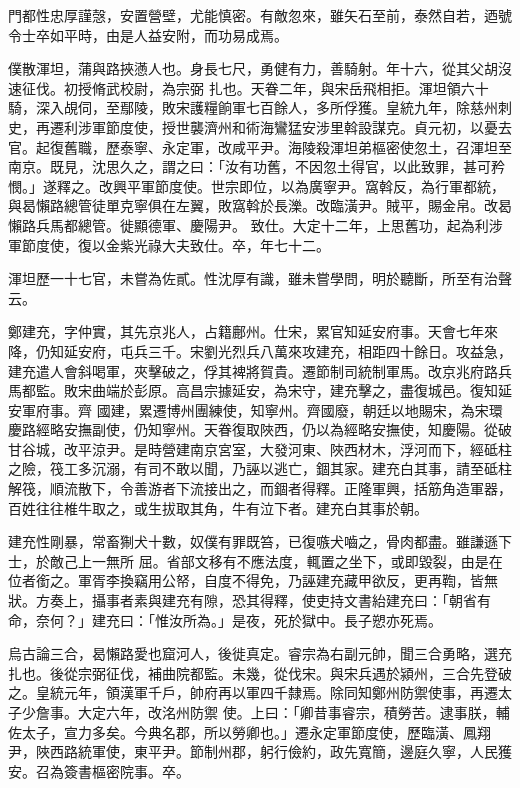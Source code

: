 \begin{pinyinscope}
 門都性忠厚謹愨，安置營壁，尤能慎密。有敵忽來，雖矢石至前，泰然自若，迺號令士卒如平時，由是人益安附，而功易成焉。



 僕散渾坦，蒲與路挾懣人也。身長七尺，勇健有力，善騎射。年十六，從其父胡沒速征伐。初授脩武校尉，為宗弼
 扎也。天眷二年，與宋岳飛相拒。渾坦領六十騎，深入覘伺，至鄢陵，敗宋護糧餉軍七百餘人，多所俘獲。皇統九年，除慈州刺史，再遷利涉軍節度使，授世襲濟州和術海鸞猛安涉里斡設謀克。貞元初，以憂去官。起復舊職，歷泰寧、永定軍，改咸平尹。海陵殺渾坦弟樞密使忽土，召渾坦至南京。既見，沈思久之，謂之曰：「汝有功舊，不因忽土得官，以此致罪，甚可矜憫。」遂釋之。改興平軍節度使。世宗即位，以為廣寧尹。窩斡反，為行軍都統，與曷懶路總管徒單克寧俱在左翼，敗窩斡於長濼。改臨潢尹。賊平，賜金帛。改曷懶路兵馬都總管。徙顯德軍、慶陽尹。
 致仕。大定十二年，上思舊功，起為利涉軍節度使，復以金紫光祿大夫致仕。卒，年七十二。



 渾坦歷一十七官，未嘗為佐貳。性沈厚有識，雖未嘗學問，明於聽斷，所至有治聲云。



 鄭建充，字仲實，其先京兆人，占籍鄜州。仕宋，累官知延安府事。天會七年來降，仍知延安府，屯兵三千。宋劉光烈兵八萬來攻建充，相距四十餘日。攻益急，建充遣人會斜喝軍，夾擊破之，俘其裨將賀貴。遷節制司統制軍馬。改京兆府路兵馬都監。敗宋曲端於彭原。高昌宗據延安，為宋守，建充擊之，盡復城邑。復知延安軍府事。齊
 國建，累遷博州團練使，知寧州。齊國廢，朝廷以地賜宋，為宋環慶路經略安撫副使，仍知寧州。天眷復取陜西，仍以為經略安撫使，知慶陽。從破甘谷城，改平涼尹。是時營建南京宮室，大發河東、陜西材木，浮河而下，經砥柱之險，筏工多沉溺，有司不敢以聞，乃誣以逃亡，錮其家。建充白其事，請至砥柱解筏，順流散下，令善游者下流接出之，而錮者得釋。正隆軍興，括筋角造軍器，百姓往往椎牛取之，或生拔取其角，牛有泣下者。建充白其事於朝。



 建充性剛暴，常畜猘犬十數，奴僕有罪既笞，已復嗾犬嚙之，骨肉都盡。雖謙遜下士，於敵己上一無所
 屈。省部文移有不應法度，輒置之坐下，或即毀裂，由是在位者銜之。軍胥李換竊用公帑，自度不得免，乃誣建充藏甲欲反，更再鞫，皆無狀。方奏上，攝事者素與建充有隙，恐其得釋，使吏持文書紿建充曰：「朝省有命，奈何？」建充曰：「惟汝所為。」是夜，死於獄中。長子愬亦死焉。



 烏古論三合，曷懶路愛也窟河人，後徙真定。睿宗為右副元帥，聞三合勇略，選充扎也。後從宗弼征伐，補曲院都監。未幾，從伐宋。與宋兵遇於潁州，三合先登破之。皇統元年，領漢軍千戶，帥府再以軍四千隸焉。除同知鄭州防禦使事，再遷太子少詹事。大定六年，改洺州防禦
 使。上曰：「卿昔事睿宗，積勞苦。逮事朕，輔佐太子，宣力多矣。今典名郡，所以勞卿也。」遷永定軍節度使，歷臨潢、鳳翔尹，陜西路統軍使，東平尹。節制州郡，躬行儉約，政先寬簡，邊庭久寧，人民獲安。召為簽書樞密院事。卒。




\end{pinyinscope}
